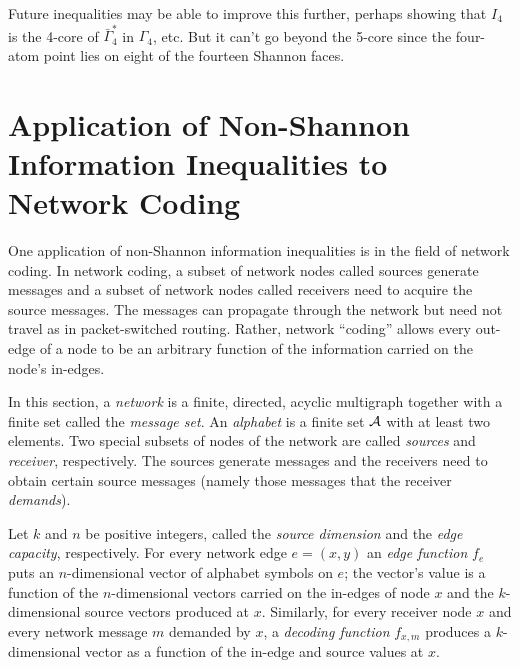 \documentclass[10pt,journal]{IEEEtran}
\begin{document}
Future inequalities may be able to improve this further, perhaps showing that $I_4$ is the 4-core
of $\bar\Gamma^*_4$ in $\Gamma_4$, etc.  But it can't go beyond the 5-core
since the four-atom point lies on eight of the fourteen Shannon faces.


%
%



\section{Application of Non-Shannon Information Inequalities to Network Coding}\label{Vamos}


One application of non-Shannon information inequalities is in the field of network coding.
In network coding, a subset of network nodes called sources generate messages
and a subset of network nodes called receivers need to acquire the source messages.
The messages can propagate through the network but need not travel as in packet-switched routing.
Rather, network ``coding'' allows every out-edge of a node to be
an arbitrary function of the information carried on the node's in-edges.

In this section,
a \textit{network} is a finite, directed, acyclic multigraph
together with a finite set called the \textit{message set}.
An \textit{alphabet} is a finite set $\mathcal{A}$ with at least two elements.
Two special subsets of nodes of the network are called \textit{sources}
and \textit{receiver}, respectively.
The sources generate messages and the receivers need to obtain
certain source messages
(namely those messages that the receiver \textit{demands}).
%

Let $k$ and $n$ be positive integers,
called the \textit{source dimension} and the \textit{edge capacity}, respectively.
%
For every network edge $e=(x,y)$
an \textit{edge function} $f_e$
puts an $n$-dimensional vector of alphabet symbols on $e$;
the vector's value is a function of the $n$-dimensional vectors carried on the in-edges of node $x$
and the $k$-dimensional source vectors produced at $x$.
%
Similarly,
for every receiver node $x$ and every network message $m$ demanded by $x$,
a \textit{decoding function}
$f_{x,m}$
produces a $k$-dimensional vector
as a function of the in-edge and source values at $x$.
\end{document}
